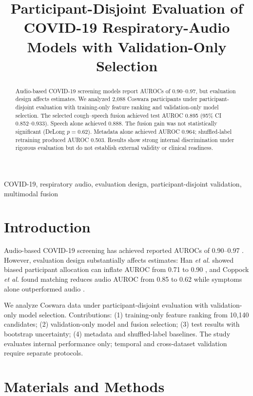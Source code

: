 \documentclass[conference]{IEEEtran}
\title{Participant-Disjoint Evaluation of COVID-19 Respiratory-Audio Models with Validation-Only Selection}
\author{
\IEEEauthorblockN{Nishant Harkut and Ritu Tiwari}
\IEEEauthorblockA{Department of Information Technology\\
ABV-IIITM Gwalior, India}
}
\begin{document}
\maketitle

\begin{abstract}
Audio-based COVID-19 screening models report AUROCs of 0.90--0.97, but evaluation design affects estimates. We analyzed 2,088 Coswara participants under participant-disjoint evaluation with training-only feature ranking and validation-only model selection. The selected cough--speech fusion achieved test AUROC 0.895 (95\% CI 0.852--0.933). Speech alone achieved 0.888. The fusion gain was not statistically significant (DeLong $p=0.62$). Metadata alone achieved AUROC 0.964; shuffled-label retraining produced AUROC 0.503. Results show strong internal discrimination under rigorous evaluation but do not establish external validity or clinical readiness.
\end{abstract}

\begin{IEEEkeywords}
COVID-19, respiratory audio, evaluation design, participant-disjoint validation, multimodal fusion
\end{IEEEkeywords}

\section{Introduction}

Audio-based COVID-19 screening has achieved reported AUROCs of 0.90--0.97 \cite{laguarta2020cough,bhattacharya2023coswara,aytekin2024hst}. However, evaluation design substantially affects estimates: Han \emph{et al.} showed biased participant allocation can inflate AUROC from 0.71 to 0.90 \cite{han2022realistic}, and Coppock \emph{et al.} found matching reduces audio AUROC from 0.85 to 0.62 while symptoms alone outperformed audio \cite{coppock2024audio}.

We analyze Coswara data under participant-disjoint evaluation with validation-only model selection. Contributions: (1) training-only feature ranking from 10,140 candidates; (2) validation-only model and fusion selection; (3) test results with bootstrap uncertainty; (4) metadata and shuffled-label baselines. The study evaluates internal performance only; temporal and cross-dataset validation require separate protocols.

\section{Materials and Methods}
\end{document}
